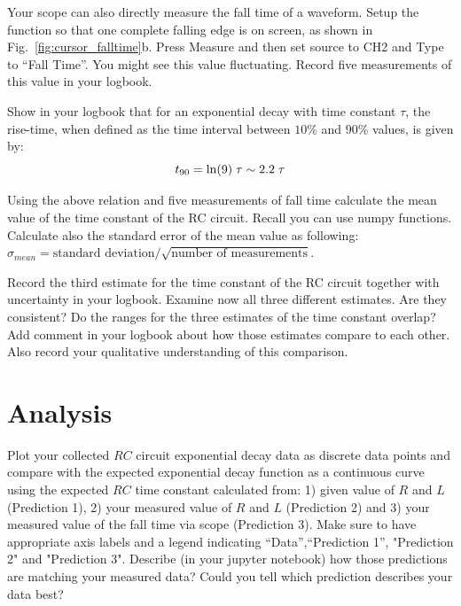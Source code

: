 \begin{measurement} Your scope can also directly measure the fall time of a waveform.
Setup the function so that one complete falling edge is on screen, as
shown in Fig.~\ref{fig:cursor_falltime}b.  Press Measure and then set
source to CH2 and Type to ``Fall Time''. You might see this value fluctuating. Record five measurements of this value in your logbook.\end{measurement}


\begin{measurement}
Show in your logbook that for an exponential decay with time constant $\tau$, the rise-time, when defined as the time interval between $10\%$ and $90\%$ values, is given by:
\begin{displaymath}
t_{90} = {\rm ln}(9) \; \tau \sim 2.2 \; \tau
\end{displaymath}
\end{measurement}

\begin{plot} Using the above relation and five measurements of fall time calculate the mean value of the time constant of the RC circuit. Recall you can use numpy functions. Calculate also the standard error of the mean value as following: $\sigma_{mean}= \mbox{standard deviation}/\sqrt{\mbox{number of measurements}}$.
\end{plot} 

\begin{measurement} Record the third estimate for the time constant of the RC circuit together with uncertainty in your logbook. Examine now all three different estimates. Are they consistent? Do the ranges for the three estimates of the time constant overlap? Add comment in your logbook about how those estimates compare to each other. Also record your qualitative understanding of this comparison. 
\end{measurement}




\section{Analysis}

\begin{plot} Plot your collected $RC$ circuit exponential decay data as discrete
data points and compare with the expected exponential decay function
as a continuous curve using the expected $RC$ time constant calculated
from: 1) given value of $R$ and $L$ (Prediction 1), 2) your measured value of $R$ and $L$ (Prediction 2) and 3) your measured value of the fall time via scope (Prediction 3).  Make sure to have
appropriate axis labels and a legend indicating ``Data'',``Prediction 1'', "Prediction 2" and "Prediction 3". 
Describe (in your jupyter notebook) how those predictions are matching your measured data? Could you tell which prediction describes your data best?
\end{plot}

